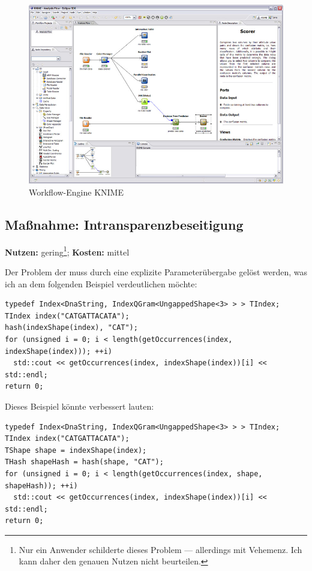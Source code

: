 \begin{figure}
  \centering
    \includegraphics[width=0.8\linewidth]{Figures/knime.jpg}
  \caption{Workflow-Engine KNIME}
  \label{fig:knime}
\end{figure}




\subsection{Maßnahme: Intransparenzbeseitigung}
\textbf{Nutzen:} gering\footnote{Nur ein Anwender schilderte dieses Problem --- allerdings mit Vehemenz. Ich kann daher den genauen Nutzen nicht beurteilen.}; \textbf{Kosten:} mittel

Der Problem der  muss durch eine explizite Parameterübergabe gelöst werden, was ich an dem folgenden Beispiel verdeutlichen möchte:

\begin{verbatim}
typedef Index<DnaString, IndexQGram<UngappedShape<3> > > TIndex;
TIndex index("CATGATTACATA");
hash(indexShape(index), "CAT");
for (unsigned i = 0; i < length(getOccurrences(index, indexShape(index))); ++i)
  std::cout << getOccurrences(index, indexShape(index))[i] << std::endl; 
return 0;
\end{verbatim}

Dieses Beispiel könnte verbessert lauten:
\begin{verbatim}
typedef Index<DnaString, IndexQGram<UngappedShape<3> > > TIndex;
TIndex index("CATGATTACATA");
TShape shape = indexShape(index);
THash shapeHash = hash(shape, "CAT");
for (unsigned i = 0; i < length(getOccurrences(index, shape, shapeHash)); ++i)
  std::cout << getOccurrences(index, indexShape(index))[i] << std::endl; 
return 0;
\end{verbatim}

